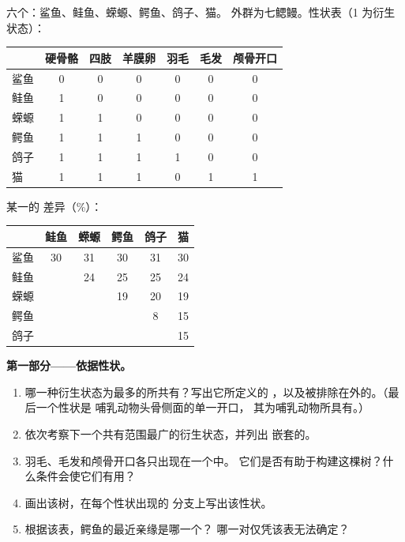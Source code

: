 \begin{problem}
\label{pb:g12:phylogenetic-trees:1}
六个：鲨鱼、鲑鱼、蝾螈、鳄鱼、鸽子、猫。
外群为七鳃鳗。性状表（1 为衍生状态）：

\begin{center}
\small
\begin{tabular}{lcccccc}
 & 硬骨骼 & 四肢 & 羊膜卵 & 羽毛 & 毛发 & 颅骨开口 \\ \hline
鲨鱼 & 0 & 0 & 0 & 0 & 0 & 0 \\
鲑鱼 & 1 & 0 & 0 & 0 & 0 & 0 \\
蝾螈 & 1 & 1 & 0 & 0 & 0 & 0 \\
鳄鱼 & 1 & 1 & 1 & 0 & 0 & 0 \\
鸽子 & 1 & 1 & 1 & 1 & 0 & 0 \\
猫 & 1 & 1 & 1 & 0 & 1 & 1 \\
\end{tabular}
\end{center}

某一的  差异（\%）：

\begin{center}
\begin{tabular}{lccccc}
 & 鲑鱼 & 蝾螈 & 鳄鱼 & 鸽子 & 猫 \\ \hline
鲨鱼 & 30 & 31 & 30 & 31 & 30 \\
鲑鱼 & & 24 & 25 & 25 & 24 \\
蝾螈 & & & 19 & 20 & 19 \\
鳄鱼 & & & & 8 & 15 \\
鸽子 & & & & & 15 \\
\end{tabular}
\end{center}

\medskip
\noindent\textbf{第一部分——依据性状。}
\begin{enumerate}
  \item 哪一种衍生状态为最多的所共有？写出它所定义的
        ，以及被排除在外的。（最后一个性状是
        哺乳动物头骨侧面的单一开口，
        其为哺乳动物所具有。）
  \item 依次考察下一个共有范围最广的衍生状态，并列出
        嵌套的。
  \item 羽毛、毛发和颅骨开口各只出现在一个中。
        它们是否有助于构建这棵树？什么条件会使它们有用？
  \item 画出该树，在每个性状出现的
        分支上写出该性状。
  \item 根据该表，鳄鱼的最近亲缘是哪一个？
        哪一对仅凭该表无法确定？
\end{enumerate}


\end{problem}

